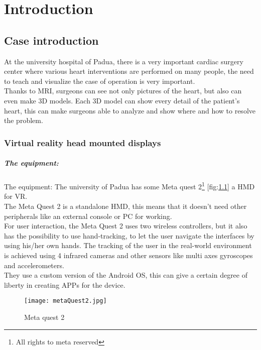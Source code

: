 
\chapter{Introduction}
\label{chp:intro}

\section{Case introduction}

At the university hospital of Padua, 
there is a very important cardiac surgery center where various heart interventions are performed on many people,
the need to teach and visualize the case of operation is very important. \\
Thanks to MRI, surgeons can see not only pictures of the heart, but also can even make 3D models.
Each 3D model can show every detail of the patient's heart, this can make surgeons able to analyze and show where and how to resolve the problem.

\subsection{Virtual reality head mounted displays}

\paragraph{The equipment:}
The equipment: The university of Padua has some Meta quest 2\footnote{All rights to meta reserved} [fig:\ref{fig:metaQuest2}] a \ac{HMD} for \ac{VR}.\\ 
The Meta Quest 2 is a standalone \ac{HMD}, this means that it doesn’t need other peripherals like an external console or \ac{PC} for working.\\
For user interaction, the Meta Quest 2 uses two wireless controllers, but it also has the possibility to use hand-tracking, to let the user navigate the interfaces by using his/her own hands.
The tracking of the user in the real-world environment is achieved using 4 infrared cameras and other sensors like multi axes gyroscopes and accelerometers.\\
They use a custom version of the Android \ac{OS}, this can give a certain degree of liberty in creating APPs for the device.

\begin{figure}[h]
  \centering
  \texttt{[image: metaQuest2.jpg]}
  \caption{Meta quest 2}
  \label{fig:metaQuest2}
\end{figure}

